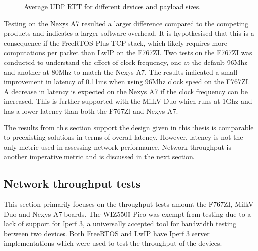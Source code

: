 \begin{figure}[ht]
    \centering
    \caption{Average UDP RTT for different devices and payload sizes.}
    \label{fig:avg_udp_rtt}
    \end{figure}
    

Testing on the Nexys A7 resulted a larger difference compared to the competing products and indicates a larger software overhead. It is hypothesised that this is a consequence if the FreeRTOS-Plus-TCP stack, which likely requires more computations per packet than LwIP on the F767ZI. Two tests on the F767ZI was conducted to understand the effect of clock frequency, one at the default 96Mhz and another at 80Mhz to match the Nexys A7. The results indicated a small improvement in latency of 0.11ms when using 96Mhz clock speed on the F767ZI. A decrease in latency is expected on the Nexys A7 if the clock frequency can be increased. This is further supported with the MilkV Duo which runs at 1Ghz and has a lower latency than both the F767ZI and Nexys A7.

The results from this section support the design given in this thesis is comparable to preexisting solutions in terms of overall latency. However, latency is not the only metric used in assessing network performance. Network throughput is another imperative metric and is discussed in the next section.


\subsection{Network throughput tests}
This section primarily focuses on the throughput tests amount the F767ZI, MilkV Duo and Nexys A7 boards. The WIZ5500 Pico was exempt from testing due to a lack of support for Iperf 3, a universally accepted tool for bandwidth testing between two devices. Both FreeRTOS and LwIP have Iperf 3 server implementations which were used to test the throughput of the devices.


